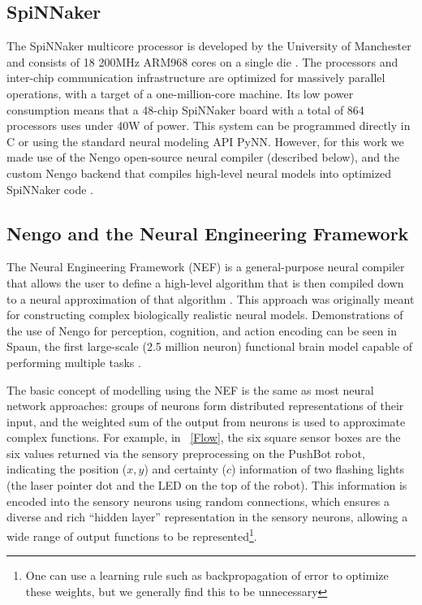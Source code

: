 \documentclass[conference]{IEEEtran}
\begin{document}
\subsection{SpiNNaker}

The SpiNNaker multicore processor is developed by the University of Manchester 
and consists of 18 200MHz ARM968 cores on a single die \cite{furber2007neural, furber2014spinnaker}. 
The processors and inter-chip communication infrastructure are optimized for
massively parallel operations, with a target of a one-million-core machine.  Its
low power consumption means that a 48-chip SpiNNaker board with a total of 
864 processors uses under 40W of power. This system can be programmed directly 
in C or using the standard neural modeling API PyNN. However, for this work
we made use of the Nengo open-source neural compiler \cite{bekolay_nengo2014} 
(described below), and the custom Nengo backend that compiles high-level
neural models into optimized SpiNNaker code \cite{mundy2015}.

\subsection{Nengo and the Neural Engineering Framework}

The Neural Engineering Framework (NEF) is a general-purpose neural compiler 
that allows the user to define a high-level algorithm that is then compiled 
down to a neural approximation of that algorithm \cite{eliasmith2004neural}. 
This approach was originally meant for constructing complex biologically realistic neural 
models. Demonstrations of the use of Nengo for perception, cognition, and 
action encoding can be seen in Spaun, the first large-scale 
(2.5 million neuron) functional brain model capable of performing multiple 
tasks  \cite{eliasmith_largescale_2012}. 

The basic concept of modelling using the NEF is the same as most neural network
approaches: groups of neurons form distributed representations of their input,
and the weighted sum of the output from neurons is used to approximate
complex functions.  For example, in \figurename~\ref{Flow}, the six square
sensor boxes are the six values returned via the sensory preprocessing on the
PushBot robot, indicating the position ($x, y$) and certainty ($c$) information 
of two flashing lights (the laser pointer dot and the LED on the top of the
robot).  This information is encoded into the sensory neurons using random
connections, which ensures a diverse and rich ``hidden layer''
representation in the sensory neurons, allowing a wide range of output
functions to be represented\footnote{One can use a
learning rule such as backpropagation of error to optimize these weights,
but we generally find this to be unnecessary}.
\end{document}
